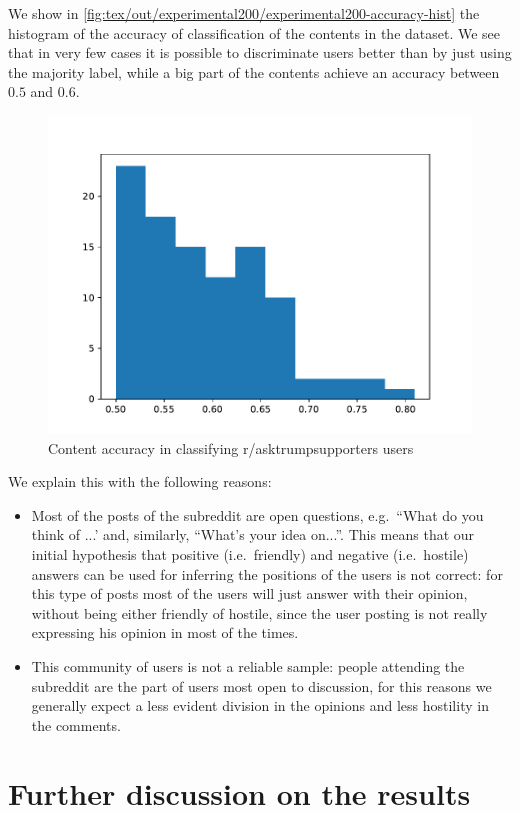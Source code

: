 
We show in \autoref{fig:tex/out/experimental200/experimental200-accuracy-hist}
the histogram of the accuracy of classification of the contents in the dataset.
We see that in very few cases it is possible to discriminate users better than
by just using the majority label, while a big part of the contents achieve an
accuracy between $0.5$ and $0.6$.

\begin{figure}
	\centering
	\includegraphics[width=0.6\linewidth]{tex/out/experimental200/experimental200-accuracy-hist.pdf}
	\caption{Content accuracy in classifying r/asktrumpsupporters users}%
	\label{fig:tex/out/experimental200/experimental200-accuracy-hist}
\end{figure}

We explain this with the following reasons:
\begin{itemize}
	\item Most of the posts of the subreddit are open questions, e.g.\ ``What
	      do you think of ...' and, similarly, ``What's your idea on...''. This
	      means that our initial hypothesis that positive (i.e.\ friendly) and negative
	      (i.e.\ hostile) answers can be used for inferring the positions of
	      the users is not correct: for this type of posts most of the users
	      will just answer with their opinion, without being either friendly of
	      hostile, since the user posting is not really expressing his opinion
	      in most of the times.
	\item This community of users is not a reliable sample: people attending
	      the subreddit are the part of users most open to discussion, for this
	      reasons we generally expect a less evident division in the opinions and
	      less hostility in the comments.
\end{itemize}

\section{Further discussion on the results}%
\label{sec:discussion}

